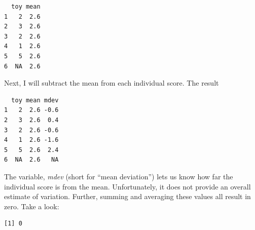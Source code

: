 \documentclass[
  11pt,
]{book}
\newenvironment{Shaded}{\begin{snugshade}}{\end{snugshade}}
\newcommand{\AttributeTok}[1]{\textcolor[rgb]{0.77,0.63,0.00}{#1}}
\newcommand{\CommentTok}[1]{\textcolor[rgb]{0.56,0.35,0.01}{\textit{#1}}}
\newcommand{\ConstantTok}[1]{\textcolor[rgb]{0.00,0.00,0.00}{#1}}
\newcommand{\DecValTok}[1]{\textcolor[rgb]{0.00,0.00,0.81}{#1}}
\newcommand{\FunctionTok}[1]{\textcolor[rgb]{0.00,0.00,0.00}{#1}}
\newcommand{\NormalTok}[1]{#1}
\newcommand{\OtherTok}[1]{\textcolor[rgb]{0.56,0.35,0.01}{#1}}
\newcommand{\SpecialCharTok}[1]{\textcolor[rgb]{0.00,0.00,0.00}{#1}}
\begin{document}
\begin{verbatim}
  toy mean
1   2  2.6
2   3  2.6
3   2  2.6
4   1  2.6
5   5  2.6
6  NA  2.6
\end{verbatim}

Next, I will subtract the mean from each individual score. The result

\begin{Shaded}
\end{Shaded}

\begin{verbatim}
  toy mean mdev
1   2  2.6 -0.6
2   3  2.6  0.4
3   2  2.6 -0.6
4   1  2.6 -1.6
5   5  2.6  2.4
6  NA  2.6   NA
\end{verbatim}

The variable, \emph{mdev} (short for ``mean deviation'') lets us know how far the individual score is from the mean. Unfortunately, it does not provide an overall estimate of variation. Further, summing and averaging these values all result in zero. Take a look:

\begin{Shaded}
\end{Shaded}

\begin{verbatim}
[1] 0
\end{verbatim}

\begin{Shaded}
\end{Shaded}
\end{document}
